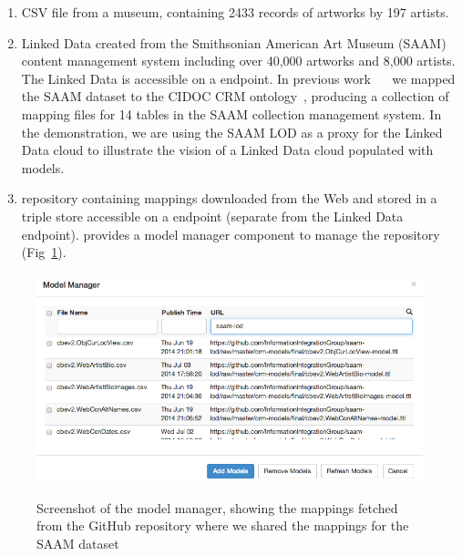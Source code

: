 \begin{enumerate}
\item CSV file from a museum, containing 2433 records of artworks by 197 artists.

\item Linked Data created from the Smithsonian American Art Museum (SAAM) content management system including over 40,000 artworks and 8,000 artists. 
The Linked Data is accessible on a \sparql endpoint.
In previous work~\cite{Szekely:2013vq} ~ we mapped the SAAM dataset to the CIDOC CRM ontology~\cite{Doerr:2003:CCR:958671.958678}, producing a collection of \rtworml mapping files for 14 tables in the SAAM collection management system.
In the demonstration, we are using the SAAM LOD as a proxy for the Linked Data cloud to illustrate the vision of a Linked Data cloud populated with \rtworml models.

\item \rtworml repository containing \rtworml mappings downloaded from the Web and stored in a triple store accessible on a \sparql endpoint (separate from the Linked Data endpoint).
\karma provides a model manager component to manage the \rtworml repository (Fig~\ref{fig:model-manager-screenshot}).
\end{enumerate}
%

\begin{figure}[bth]
\begin{center}
\includegraphics[width=4.8in]{images/3-model-manager.png}
\vspace{-3mm}
\caption{Screenshot of the model manager, showing the \rtworml mappings fetched from the GitHub repository where we shared the mappings for the SAAM dataset}
\vspace{-2mm}
\label{fig:model-manager-screenshot}
\end{center}
\vspace{-1.5em}
\end{figure}